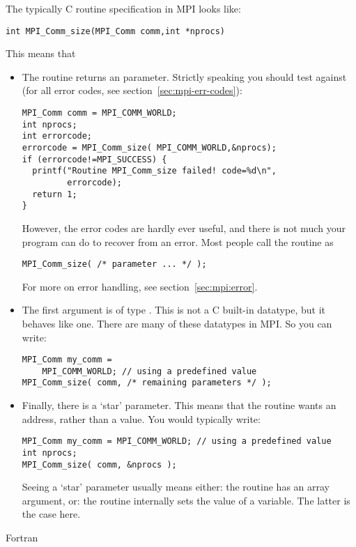 The typically C routine specification in MPI looks like:
\begin{lstlisting}
int MPI_Comm_size(MPI_Comm comm,int *nprocs)
\end{lstlisting}
This means that
\begin{itemize}
\item The routine returns an  parameter. Strictly speaking you
  should test against  (for all error codes,
  see section~\ref{sec:mpi-err-codes}):
\begin{lstlisting}
MPI_Comm comm = MPI_COMM_WORLD;
int nprocs;
int errorcode;
errorcode = MPI_Comm_size( MPI_COMM_WORLD,&nprocs);
if (errorcode!=MPI_SUCCESS) {
  printf("Routine MPI_Comm_size failed! code=%d\n",
         errorcode);
  return 1;
}
\end{lstlisting}
  However, the error codes are hardly ever useful, and there is not
  much your program can do to recover from an error. Most people call
  the routine as
\begin{lstlisting}
MPI_Comm_size( /* parameter ... */ );
\end{lstlisting}
For more on error handling, see section~\ref{sec:mpi:error}.
\item The first argument is of type . This is not a C
  built-in datatype, but it behaves like one. There are many of these
   datatypes in MPI. So you can write:
\begin{lstlisting}
MPI_Comm my_comm =
    MPI_COMM_WORLD; // using a predefined value
MPI_Comm_size( comm, /* remaining parameters */ );
\end{lstlisting}
\item Finally, there is a `star' parameter. This means that the
  routine wants an address, rather than a value. You would typically write:
\begin{lstlisting}
MPI_Comm my_comm = MPI_COMM_WORLD; // using a predefined value
int nprocs;
MPI_Comm_size( comm, &nprocs );
\end{lstlisting}
  Seeing a `star' parameter usually means either: the routine has an
  array argument, or: the routine internally sets the value of a
  variable. The latter is the case here.
\end{itemize}

 {Fortran}

